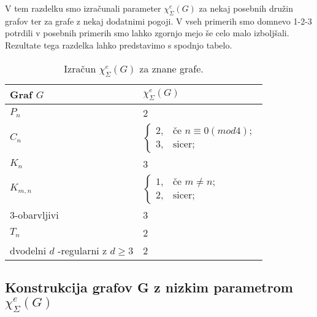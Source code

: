 \documentclass[12pt,a4paper,twoside]{article}
\theoremstyle{definition} %
\theoremstyle{plain} %
\newcommand{\ec}{\chi_{\Sigma}^e}
\numberwithin{equation}{section}  %
\begin{document}
V tem razdelku smo izračunali parameter $\ec(G)$ za nekaj posebnih družin grafov ter za grafe z nekaj dodatnimi pogoji. V vseh primerih smo domnevo 1-2-3 potrdili v posebnih primerih smo lahko zgornjo mejo še celo malo izboljšali. Rezultate tega razdelka lahko predstavimo s spodnjo tabelo.
\begin{table}[H]

\caption{\label{tab:tab1} Izračun $\ec(G)$ za znane grafe. }
\centering
\begin{tabular}{|l|l|}
\hline
 Graf $G$ & $\ec(G)$  \\ \hline
 $P_n$ & 2  \\ \hline
 $C_n$ & $\begin{cases}
	2 ,& \text{če } n \equiv 0 (mod 4);\\ 
	3, & \text{sicer};
	\end{cases}$  \\ \hline
 $K_n$& 3  \\ \hline
 $K_{m,n}$& $\begin{cases}
	1 ,& \text{če } m \neq n;\\ 
	2 ,& \text{sicer};
	\end{cases}$  \\ \hline
 $3$-obarvljivi& 3  \\ \hline
$T_n$ & 2  \\ \hline
dvodelni $d$ -regularni z $d \ge 3 $ & 2  \\ \hline
\end{tabular}
\end{table}

\subsection{Konstrukcija grafov G z nizkim parametrom $\ec(G)$}
\end{document}
